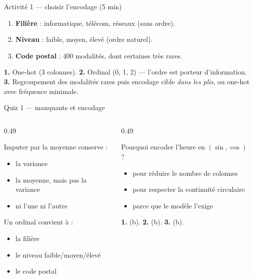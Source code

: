 \begin{frame}{Activité 1 --- choisir l'encodage (5 min)}
\begin{abox}
\begin{enumerate}
  \item \textbf{Filière} : informatique, télécom, réseaux (sans ordre).
  \item \textbf{Niveau} : faible, moyen, élevé (ordre naturel).
  \item \textbf{Code postal} : 400 modalités, dont certaines très rares.
\end{enumerate}
\end{abox}
\vspace{1mm}
\begin{solbox}[Réponses]
\textbf{1.} One-hot (3 colonnes).
\textbf{2.} Ordinal (0, 1, 2) --- l'ordre est porteur d'information.
\textbf{3.} Regroupement des modalités rares puis encodage cible \emph{dans les
plis}, ou one-hot avec fréquence minimale.
\end{solbox}
\end{frame}

\begin{frame}{Quiz 1 --- manquants et encodage}
\begin{columns}[t]
\begin{column}{0.49\textwidth}
\begin{qbox}[Question 1]
Imputer par la moyenne conserve :
\begin{itemize}
  \item[(a)] la variance
  \item[(b)] la moyenne, mais pas la variance
  \item[(c)] ni l'une ni l'autre
\end{itemize}
\end{qbox}
\begin{qbox}[Question 2]
Un ordinal convient à :
\begin{itemize}
  \item[(a)] la filière
  \item[(b)] le niveau faible/moyen/élevé
  \item[(c)] le code postal
\end{itemize}
\end{qbox}
\end{column}
\begin{column}{0.49\textwidth}
\begin{qbox}[Question 3]
Pourquoi encoder l'heure en $(\sin,\cos)$ ?
\begin{itemize}
  \item[(a)] pour réduire le nombre de colonnes
  \item[(b)] pour respecter la continuité circulaire
  \item[(c)] parce que le modèle l'exige
\end{itemize}
\end{qbox}
\begin{solbox}[Réponses]
\textbf{1.} (b). \quad \textbf{2.} (b). \quad \textbf{3.} (b).
\end{solbox}
\end{column}
\end{columns}
\end{frame}
